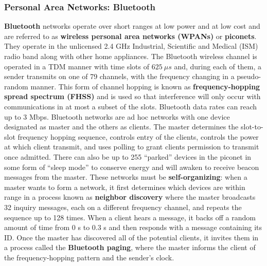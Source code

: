 \documentclass{article}
\begin{document}
\subsubsection{Personal Area Networks: Bluetooth}
\textbf{Bluetooth} networks operate over short ranges at low power and at low cost and are referred to as \textbf{wireless personal area networks (WPANs)} or \textbf{piconets}. 
They operate in the unlicensed 2.4 GHz Industrial, Scientific and Medical (ISM) radio band along with other home appliances.
The Bluetooth wireless channel is operated in a TDM manner with time slots of $625 \ \mu s$ and, during each of them, a sender transmits on one of 79 channels, with the frequency changing in a pseudo-random manner.
This form of channel hopping is known as \textbf{frequency-hopping spread spectrum (FHSS)} and is used so that interference will only occur with communications in at most a subset of the slots.
Bluetooth data rates can reach up to 3 Mbps. 
Bluetooth networks are ad hoc networks with one device designated as master and the others as clients.
The master determines the slot-to-slot frequency hopping sequence, controls entry of the clients, controls the power at which client transmit, and uses polling to grant clients permission to transmit once admitted.
There can also be up to 255 “parked” devices in the piconet in some form of “sleep mode” to conserve energy and will awaken to receive beacon messages from the master. 
These networks must be \textbf{self-organizing}: when a master wants to form a network, it first determines which devices are within range in a process known as \textbf{neighbor discovery} where the master broadcasts 32 inquiry messages, each on a different frequency channel, and repeats the sequence up to 128 times.
When a client hears a message, it backs off a random amount of time from 0 s to 0.3 s and then responds with a message containing its ID.
Once the master has discovered all of the potential clients, it invites them in a process called the \textbf{Bluetooth paging}, where the master informs the client of the frequency-hopping pattern and the sender’s clock.
\end{document}
